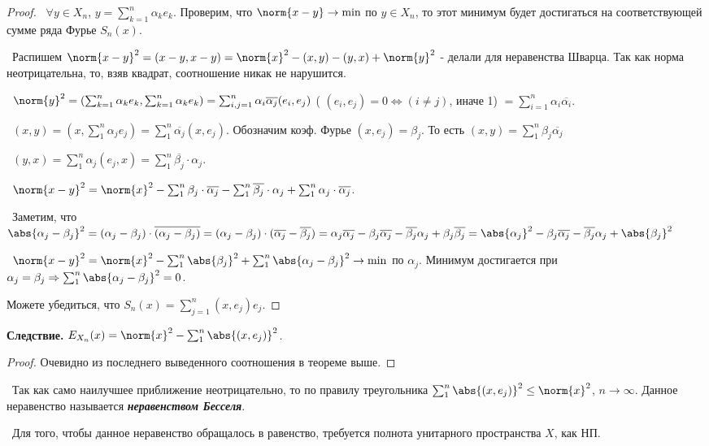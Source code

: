 \begin{proof}
\smallskip
\par\noindent \textbullet~$\forall y \in X_n$, $y = \sum_{k = 1}^n \alpha_k e_k$. Проверим, что $\norm{x - y} \to \min$ по $y \in X_n$, то этот минимум будет 
достигаться на соответствующей сумме ряда Фурье $S_n(x)$.

\smallskip
\noindent \textbullet~Распишем $\norm{x - y}^2 = (x - y, x - y) = \norm{x}^2 - (x, y) - (y, x) + \norm{y}^2$ - делали для неравенства Шварца. Так как норма неотрицательна,
то, взяв квадрат, соотношение никак не нарушится.

\smallskip
\noindent \textbullet~$\norm{y}^2 = (\sum_{k = 1}^n \alpha_k e_k, \sum_{k = 1}^n \alpha_k e_k) = \sum_{i, j = 1}^n \alpha_i \overline{\alpha_j}(e_i, e_j)$ (
$(e_i, e_j) = 0 \Longleftrightarrow (i \neq j)$, иначе 1) $= \sum_{i = 1}^{n} \alpha_i \overline{\alpha_i}$.

\smallskip
\noindent \textbullet~$(x, y) = (x, \sum_1^n \alpha_j e_j) = \sum_1^n \overline{\alpha_j} (x, e_j)$. Обозначим коэф. Фурье $(x, e_j) = \beta_j$. 
То есть $(x, y) = \sum_1^n \beta_j \overline{\alpha_j}$

\smallskip
\noindent \textbullet~$(y, x) = \sum_1^n \alpha_j (e_j, x) = \sum_1^n \overline{\beta_j} \cdot \alpha_j$.

\smallskip 
\noindent \textbullet~$\norm{x - y}^2 = \norm{x}^2 - \sum_1^n \beta_j \cdot \overline{\alpha_j} - \sum_1^n \overline{\beta_j} \cdot \alpha_j + \sum_1^n \alpha_j \cdot 
\overline{\alpha_j}$.

\smallskip 
\noindent \textbullet~Заметим, что $\abs{\alpha_j - \beta_j}^2 = (\alpha_j - \beta_j) \cdot \overline{(\alpha_j - \beta_j)} = 
(\alpha_j - \beta_j) \cdot (\overline{\alpha_j} - \overline{\beta_j}) = \alpha_j \overline{\alpha_j} - \beta_j \overline{\alpha_j} - 
\overline{\beta_j} \alpha_j + \beta_j \overline{\beta_j} = \abs{\alpha_j}^2 - \beta_j \overline{\alpha_j} - \overline{\beta_j} \alpha_j + \abs{\beta_j}^2$

\smallskip 
\noindent \textbullet~$\norm{x - y}^2 = \norm{x}^2 - \sum_1^n \abs{\beta_j}^2 + \sum_1^n \abs{\alpha_j - \beta_j}^2 \to \min$ по $\alpha_j$. Минимум достигается при 
$\alpha_j = \beta_j \Rightarrow \sum_1^n \abs{\alpha_j - \beta_j}^2 = 0$.

\smallskip
\noindent Можете убедиться, что $S_n(x) = \sum_{j = 1}^n (x, e_j) e_j$.
\end{proof}

\bigskip 
\noindent\textbf{Следствие.} \textit{$E_{X_n}(x) = \norm{x}^2 - \sum_1^n \abs{(x, e_j)}^2$.}

\begin{proof}
Очевидно из последнего выведенного соотношения в теореме выше.
\end{proof}

\bigskip
\noindent \textasteriskcentered~Так как само наилучшее приближение неотрицательно, то по правилу треугольника $\sum_1^n \abs{(x, e_j)}^2 \le \norm{x}^2$, $n \to \infty$.
Данное неравенство называется \textbf{\textit{неравенством Бесселя}}.

\smallskip
\noindent \textbullet~Для того, чтобы данное неравенство обращалось в равенство, требуется полнота унитарного пространства $X$, как НП.
